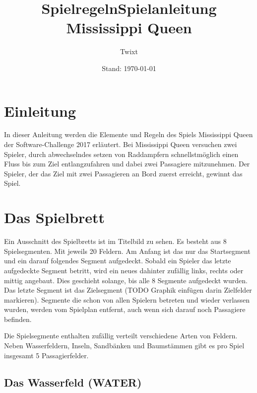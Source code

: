 \documentclass[12pt,a4paper, ngerman, oneside]{scrartcl}
\title{Spielregeln}
\subtitle{Twixt}
\date{Stand: \today}
\title{Spielanleitung Mississippi Queen}
\def\Tiles/{8}
\def\FieldsPerTile/{20}
\def\Passagiere/{5}
\begin{document}
\maketitle
\vspace*{\fill}

\newpage
\tableofcontents
\thispagestyle{empty}
\newpage
\setcounter{page}{1}

\section{Einleitung}

In dieser Anleitung werden die Elemente und Regeln des Spiels Mississippi Queen
der Software-Challenge 2017 erläutert. Bei Mississippi Queen versuchen zwei
Spieler, durch abwechselndes setzen von Raddampfern schnellstmöglich einen Fluss
bis zum Ziel entlangzufahren und dabei zwei Passagiere mitzunehmen. Der Spieler,
der das Ziel mit zwei Passagieren an Bord zuerst erreicht, gewinnt das Spiel.


\section{Das Spielbrett}

Ein Ausschnitt des Spielbretts ist im Titelbild zu sehen. Es besteht aus \Tiles/
Spielsegmenten. Mit jeweils \FieldsPerTile/ Feldern. Am Anfang ist das nur das
Startsegment und ein darauf folgendes Segment aufgedeckt. Sobald ein Spieler das
letzte aufgedeckte Segment betritt, wird ein neues dahinter zufällig links,
rechts oder mittig angebaut. Dies geschieht solange, bis alle \Tiles/ Segmente
aufgedeckt wurden. Das letzte Segment ist das Zielsegment (TODO Graphik einfügen
darin Zielfelder markieren). Segmente die schon von allen Spielern betreten und
wieder verlassen wurden, werden vom Spielplan entfernt, auch wenn sich darauf
noch Passagiere befinden.

Die Spielsegmente enthalten zufällig verteilt verschiedene Arten von Feldern.
Neben Wasserfeldern, Inseln, Sandbänken und Baumstämmen gibt es pro Spiel
insgesamt \Passagiere/ Passagierfelder.


\subsection{\label{water}Das Wasserfeld (WATER)}
\end{document}
